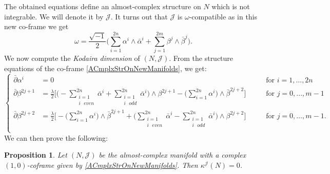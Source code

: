 \documentclass[a4paper, 11pt]{amsart}
\theoremstyle{plain}
\newtheorem{proposizione}{Proposition} [section]
\theoremstyle{definition}
\newcommand{\delbar}{\bar{\partial}}
\numberwithin{equation}{section}
\begin{document}
The obtained equations define an almost-complex structure on $N$ which is not integrable. We will denote it by $\mathcal{J}$. It turns out that $\mathcal{J}$ is $\omega$-compatible as in this new co-frame we get
\[\omega = \frac{\sqrt{-1}}{2}\bigl(\sum_{i = 1}^{2n} \alpha^{i} \wedge \bar\alpha^{i} + \sum_{j = 1}^{2m} \beta^{j} \wedge \bar\beta^{j}\bigr).\]
We now compute the \textit{Kodaira dimension} of $(N, \mathcal{J})$. From the structure equations of the co-frame \eqref{ACmplxStrOnNewManifolds}, we get:
$$
\left\{
\begin{array}{lll}
  \delbar\alpha^{i} &= 0 \qquad &\text{for } i = 1, \ldots, 2n \\[3pt]
  \delbar\beta^{2j+1} &= \frac{\lambda}{2}\bigl[\bigl(-\sum_{\substack{i = 1 \\ i \text{ }  even}}^{2n}\bar\alpha^{i} + \sum_{\substack{i = 1 \\ i \text{ } odd}}^{2n}\bar\alpha^{i}\bigr) \wedge \beta^{2j+1} - \bigl(\sum_{i = 1}^{2n} \alpha^{i}\bigr) \wedge \bar\beta^{2j+2}\bigr] \qquad & \text{for } j = 0, ..., m-1 \\[3pt]
  \delbar\beta^{2j+2} &= \frac{\lambda}{2}\bigl[-\bigl(\sum_{i = 1}^{2n} \alpha^{i}\bigr) \wedge \bar\beta^{2j+1} + \bigl(\sum_{\substack{i = 1 \\ i \text{ }  even}}^{2n}\bar\alpha^{i} - \sum_{\substack{i = 1 \\ i \text{ } odd}}^{2n}\bar\alpha^{i}\bigr) \wedge \beta^{2j+2}\bigr] \qquad &\text{for } j = 0, \ldots, m-1. \\[3pt]
\end{array}
\right.
$$
We can then prove the following:
\begin{proposizione}\label{KodairaNuove}
    Let $(N, \mathcal{J})$ be the almost-complex manifold with a complex $(1,0)$-coframe given by  \eqref{ACmplxStrOnNewManifolds}. Then $\kappa^{\mathcal{J}}(N) = 0$.
\end{proposizione}
\end{document}
